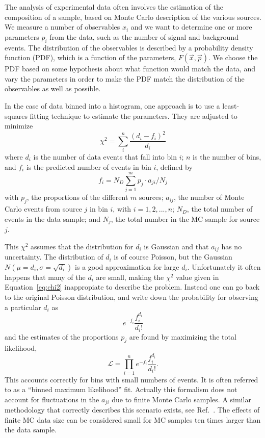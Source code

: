 The analysis of experimental data often involves the estimation of the composition of a sample, based on Monte Carlo description of the various sources. We measure a number of observables $x_i$ and we want to determine one or more parameters $p_i$ from the data, such as the number of signal and background events. The distribution  of the observables is described by a probability density function (PDF), which is a function of %
the parameters, $F(\vec{x},\vec{p})$.  We choose the PDF based on some hypothesis about what function would match the data, and vary the parameters in order to make the PDF match the distribution of the observables as well as possible. 


In the case of data binned into a histogram, one approach is to use a least-squares fitting technique to estimate the parameters. They are adjusted to minimize
%
\begin{equation}
\chi^2 = \sum^n_i \frac{(d_i - f_i)^2}{d_i}
 \label{eq:chi2}
\end{equation}
%
where $d_i$ is the number of data events that fall into bin $i$; $n$ is the number of bins, and $f_i$ is the predicted number of events in bin $i$, defined by
%
\begin{equation}
f_i = N_D\sum^m_{j=1} p_j \cdot a_{ji}/N_j
\end{equation}
%
with $p_j$, the proportions of the different $m$ sources; $a_{ij}$, the number of Monte Carlo events from source $j$ in bin $i$, with $i=1,2,...,n$; $N_D$, the total number of events in the data sample; and $N_j$, the total number in the MC sample for source $j$.

This $\chi^2$ assumes that the distribution for $d_i$ is Gaussian and that $a_{ij}$ has no uncertainty. The distribution of $d_i$ is of course Poisson, but the Gaussian $N(\mu = d_i,\sigma = \sqrt{d_i})$ is a good approximation for large  $d_i$.  Unfortunately it often happens that many of the $d_i$ are small, making the $\chi^2$ value given in Equation~\ref{eq:chi2} inappropiate to describe the problem.  Instead one can go back to the original Poisson distribution, and write down the probability for observing a particular $d_i$ as
%
\begin{equation}
e^{-f_i} \frac{f_i^{d_i}}{d_i!} 
\end{equation}
%
and the estimates of the proportions $p_j$ are found by maximizing the total likelihood, 
%
\begin{equation}
\mathcal{L} = \prod^n_{i=1} e^{-f_i} \frac{f_i^{d_i}}{d_i!}.
\end{equation}
%
This accounts correctly for bins with small numbers of events.  It is often referred to as a ``binned maximum likelihood'' fit. Actually this formalism does not account for fluctuations in the $a_{ji}$ due to finite Monte Carlo samples. A similar methodology that correctly describes this scenario exists, see Ref.~\cite{Barlow1993219}. The effects of finite MC data size can be considered small for MC samples ten times larger than the data sample. 



